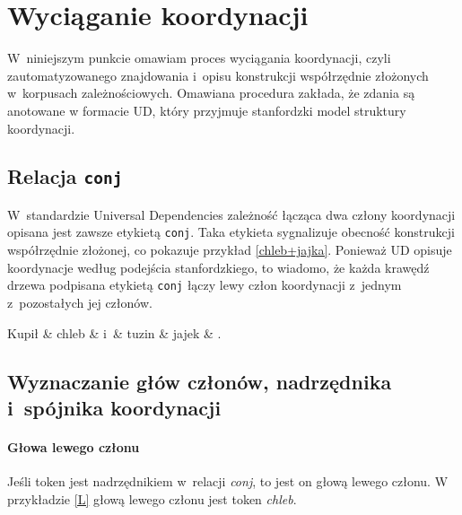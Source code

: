 \section{Wyciąganie koordynacji}

W~niniejszym punkcie omawiam proces wyciągania koordynacji, czyli zautomatyzowanego znajdowania i~opisu konstrukcji współrzędnie złożonych w~korpusach zależnościowych. Omawiana procedura zakłada, że zdania są anotowane w formacie UD, który przyjmuje stanfordzki model struktury koordynacji.

\subsection{Relacja \texttt{conj}}

W~standardzie Universal Dependencies zależność łącząca dwa człony koordynacji opisana jest zawsze etykietą \texttt{conj}. Taka etykieta sygnalizuje obecność konstrukcji współrzędnie złożonej, co pokazuje przykład \eqref{chleb+jajka}. Ponieważ UD opisuje koordynacje według podejścia stanfordzkiego, to wiadomo, że każda krawędź drzewa podpisana etykietą \texttt{conj} łączy lewy człon koordynacji z~jednym z~pozostałych jej członów.  
 
\begin{exe}
\ex \label{chleb+jajka}
\begin{dependency}[baseline=-\the\dimexpr\fontdimen22\textfont2\relax]
\begin{deptext}[column sep=1em]
Kupił \& chleb \& i~\& tuzin \& jajek \& .  \\ 
\end{deptext}
\end{dependency}
\end{exe}

\subsection{Wyznaczanie głów członów, nadrzędnika i~spójnika koordynacji}

\paragraph{Głowa lewego członu}

Jeśli token jest nadrzędnikiem w~relacji \textit{conj}, to jest on głową lewego członu. W przykładzie \eqref{L} głową lewego członu jest token \textit{chleb}.

